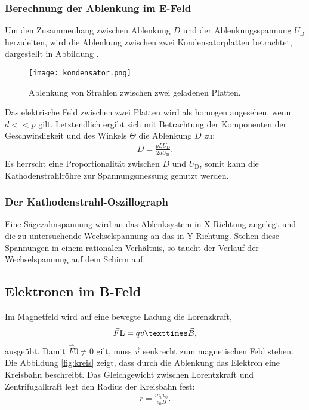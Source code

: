 \subsubsection{Berechnung der Ablenkung im E-Feld}
Um den Zusammenhang zwischen Ablenkung $D$ und der Ablenkungsspannung
$U_\mathrm{D}$ herzuleiten, wird die Ablenkung zwischen zwei
Kondensatorplatten betrachtet, dargestellt in Abbildung \label{fig:platte}.
\begin{figure}
\centering
\texttt{[image: kondensator.png]}
\caption{Ablenkung von Strahlen zwischen zwei geladenen Platten.}
\label{fig:kondensator}
\end{figure}
Das elektrische Feld zwischen zwei Platten wird als homogen angesehen, wenn
$d<<p$ gilt.
Letztendlich ergibt sich mit Betrachtung der Komponenten der Geschwindigkeit
und des Winkels $\Theta$ die Ablenkung $D$ zu:
\begin{align}
D=\frac{pLU_\mathrm{D}}{2dU_\mathrm{B}}.\label{eqn:D}
\end{align}
Es herrscht eine Proportionalität zwischen $D$ und $U_\mathrm{D}$,
somit kann die Kathodenstrahlröhre zur Spannungsmessung genutzt werden.

\subsubsection{Der Kathodenstrahl-Oszillograph}
Eine Sägezahnspannung wird an das Ablenksystem in X-Richtung angelegt und die zu untersuchende Wechselspannung an das in Y-Richtung.
Stehen diese Spannungen in einem rationalen Verhältnis, so taucht der Verlauf der Wechselspannung auf dem Schirm auf.

\subsection{Elektronen im B-Feld}
Im Magnetfeld wird auf eine bewegte Ladung die Lorenzkraft,
\begin{align}
\vec{F}\mathrm{L}=q\vec{v}\texttimes\vec{B},
\end{align}
ausgeübt. Damit $\vec{F}\mathrm{0} \neq 0 $ gilt, muss $\vec{v}$ senkrecht zum magnetischen Feld stehen.
Die Abbildung \ref{fig:kreis} zeigt, dass durch die Ablenkung das Elektron eine Kreisbahn beschreibt.
Das Gleichgewicht zwischen Lorentzkraft und Zentrifugalkraft legt den
Radius der Kreisbahn fest:
\begin{align}
r=\frac{m_\mathrm{0}v_\mathrm{0}}{e_\mathrm{0}B}\label{eqn:radius}.
\end{align}

